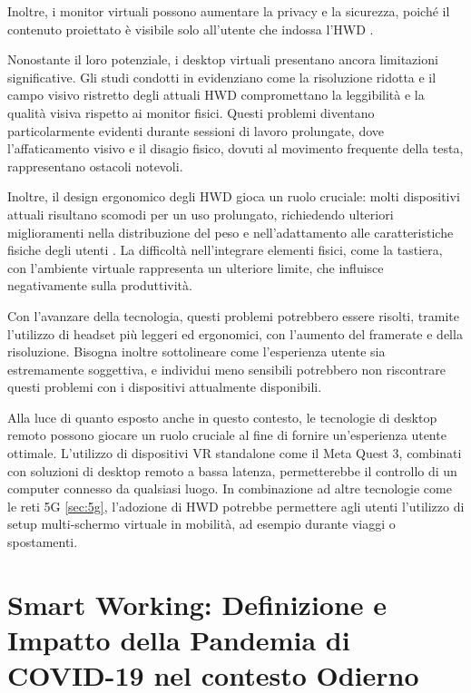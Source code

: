 \documentclass[12pt,a4paper,openright,twoside]{book}
\begin{document}
Inoltre, i monitor virtuali possono aumentare la privacy e la sicurezza, poiché il contenuto proiettato è visibile solo all'utente che indossa l'HWD \cite{pavanatto2021}.

Nonostante il loro potenziale, i desktop virtuali presentano ancora limitazioni significative. Gli studi condotti in \cite{pavanatto2021, frontiers2023} evidenziano come la risoluzione ridotta e il campo visivo ristretto degli attuali HWD compromettano la leggibilità e la qualità visiva rispetto ai monitor fisici. Questi problemi diventano particolarmente evidenti durante sessioni di lavoro prolungate, dove l'affaticamento visivo e il disagio fisico, dovuti al movimento frequente della testa, rappresentano ostacoli notevoli.

Inoltre, il design ergonomico degli HWD gioca un ruolo cruciale: molti dispositivi attuali risultano scomodi per un uso prolungato, richiedendo ulteriori miglioramenti nella distribuzione del peso e nell'adattamento alle caratteristiche fisiche degli utenti \cite{frontiers2023}. La difficoltà nell'integrare elementi fisici, come la tastiera, con l'ambiente virtuale rappresenta un ulteriore limite, che influisce negativamente sulla produttività.

Con l'avanzare della tecnologia, questi problemi potrebbero essere risolti, tramite l'utilizzo di headset più leggeri ed ergonomici, con l'aumento del framerate e della risoluzione. Bisogna inoltre sottolineare come l'esperienza utente sia estremamente soggettiva, e individui meno sensibili potrebbero non riscontrare questi problemi con i dispositivi attualmente disponibili.

Alla luce di quanto esposto anche in questo contesto, le tecnologie di desktop remoto possono giocare un ruolo cruciale al fine di fornire un'esperienza utente ottimale. L'utilizzo di dispositivi VR standalone come il Meta Quest 3, combinati con soluzioni di desktop remoto a bassa latenza, permetterebbe il controllo di un computer connesso da qualsiasi luogo. In combinazione ad altre tecnologie come le reti 5G \ref{sec:5g}, l'adozione di HWD potrebbe permettere agli utenti l'utilizzo di setup multi-schermo virtuale in mobilità, ad esempio durante viaggi o spostamenti.


\section{Smart Working: Definizione e Impatto della Pandemia di COVID-19 nel contesto Odierno}
\end{document}
